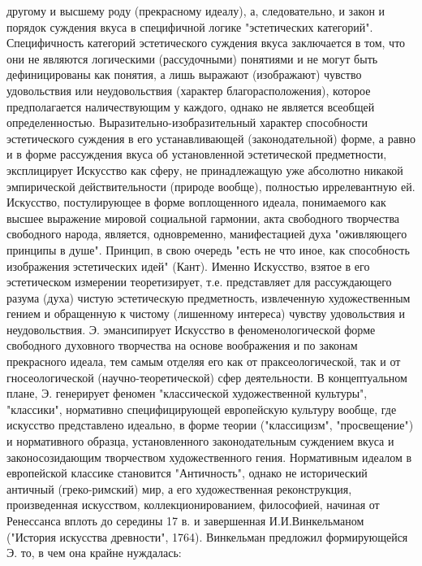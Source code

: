 \documentclass[12pt]{article}
\begin{document}
другому  и  высшему  роду  (прекрасному  идеалу),  а,  следовательно,  и  закон  и  порядок  суждения  вкуса  в
специфичной  логике  "эстетических  категорий".  Специфичность  категорий  эстетического  суждения  вкуса
заключается  в  том,  что  они  не  являются  логическими  (рассудочными)  понятиями  и  не  могут  быть
дефиницированы  как  понятия,  а  лишь  выражают  (изображают)  чувство  удовольствия  или  неудовольствия
(характер  благорасположения),  которое  предполагается  наличествующим  у  каждого,  однако  не  является
всеобщей определенностью. Выразительно-изобразительный характер способности эстетического суждения в
его  устанавливающей  (законодательной)  форме,  а  равно  и  в  форме  рассуждения  вкуса  об  установленной
эстетической предметности, эксплицирует Искусство как сферу, не принадлежащую уже абсолютно никакой 
эмпирической действительности (природе вообще), полностью иррелевантную ей. Искусство, постулирующее в
форме  воплощенного  идеала,  понимаемого  как  высшее  выражение  мировой  социальной  гармонии,  акта
свободного  творчества  свободного  народа,  является,  одновременно,  манифестацией  духа  "оживляющего
принципы в душе". Принцип, в свою очередь "есть не что иное, как способность изображения эстетических
идей" (Кант). Именно Искусство, взятое в его эстетическом измерении теоретизирует, т.е. представляет для
рассуждающего разума (духа)  чистую эстетическую  предметность,  извлеченную  художественным  гением  и
обращенную  к  чистому  (лишенному  интереса)  чувству  удовольствия  и  неудовольствия.  Э.  эмансипирует
Искусство в феноменологической форме свободного духовного творчества на основе воображения и по законам
прекрасного идеала, тем самым отделяя его как от праксеологической, так и от гносеологической (научно-теоретической)  сфер  деятельности.  В  концептуальном  плане,  Э.  генерирует  феномен  "классической
художественной  культуры",  "классики",  нормативно  специфицирующей  европейскую  культуру  вообще,  где
искусство представлено идеально, в форме теории ("классицизм", "просвещение") и нормативного образца,
установленного законодательным суждением вкуса и законосозидающим творчеством художественного гения.
Нормативным идеалом в европейской классике становится "Античность", однако не исторический античный
(греко-римский) мир, а его художественная реконструкция, произведенная искусством, коллекционированием,
философией, начиная от Ренессанса вплоть до середины 17 в. и завершенная И.И.Винкельманом ("История
искусства  древности", 1764). Винкельман  предложил  формирующейся  Э. то, в  чем она  крайне  нуждалась:
\end{document}
